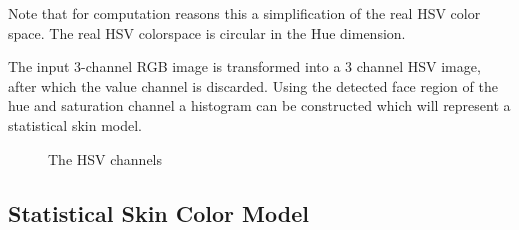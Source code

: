 Note that for computation reasons this a simplification of the real HSV color space. The real HSV colorspace is circular in the Hue dimension.

The input 3-channel RGB image is transformed into a 3 channel HSV image, after which the value channel is discarded. Using the detected face region of the hue and saturation channel a histogram can be constructed which will represent a statistical skin model.

\begin{figure}[tb]
  \centering
{}
\hspace{0.03\linewidth}
\hspace{0.03\linewidth}
  \caption{The HSV channels}
  \label{fig:hsvchannels}
\end{figure}




\subsection*{Statistical Skin Color Model}

